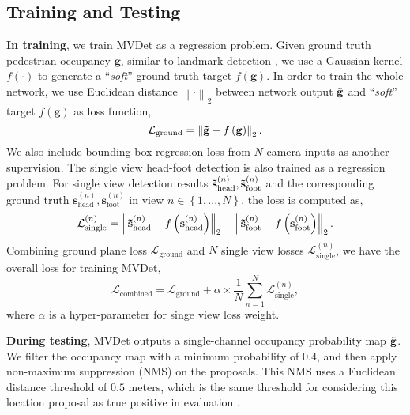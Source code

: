 \documentclass[runningheads]{llncs}
\begin{document}
\subsection{Training and Testing}
\label{sec:sec:training}
\textbf{In training}, we train MVDet as a regression problem. Given ground truth pedestrian occupancy $\mathbf{g}$, similar to landmark detection \cite{cao2017realtime}, we use a Gaussian kernel $f\left(\cdot\right)$ to generate a ``\textit{soft}'' ground truth target $f\left(\mathbf{g}\right)$. In order to train the whole network, we use Euclidean distance $\left\|\cdot\right\|_2$ between network output $\mathbf{\Tilde{g}}$ and ``\textit{soft}'' target $f\left(\mathbf{g}\right)$ as loss function,
\begin{equation}
    \label{eq:ground_loss}
    \mathcal{L}_{\text{ground}}=\left\|\mathbf{\Tilde{g}}-f\left(\mathbf{g}\right)\right\|_2. 
\end{equation}
We also include bounding box regression loss from $N$ camera inputs as another supervision. The single view head-foot detection is also trained as a regression problem. For single view detection results $\mathbf{\Tilde{s}}_{\text{head}}^{\left(n\right)},\mathbf{\Tilde{s}}_{\text{foot}}^{\left(n\right)}$ and the corresponding ground truth $\mathbf{s}_{\text{head}}^{\left(n\right)},\mathbf{s}_{\text{foot}}^{\left(n\right)}$ in view $n\in\left\{1,...,N\right\}$, the loss is computed as,
\begin{equation}
    \label{eq:single_view_loss}
    \mathcal{L}_{\text{single}}^{\left(n\right)}
    =
    \left\|\mathbf{\Tilde{s}}_{\text{head}}^{\left(n\right)}-f\left(\mathbf{s}_{\text{head}}^{\left(n\right)}\right)\right\|_2
    +
    \left\|\mathbf{\Tilde{s}}_{\text{foot}}^{\left(n\right)}-f\left(\mathbf{s}_{\text{foot}}^{\left(n\right)}\right)\right\|_2. 
\end{equation}
Combining ground plane loss $\mathcal{L}_{\text{ground}}$ and $N$ single view losses $\mathcal{L}_{\text{single}}^{\left(n\right)}$, we have the overall loss for training MVDet,
\begin{equation}
    \label{eq:combined_loss}
    \mathcal{L}_{\text{combined}}=\mathcal{L}_{\text{ground}}+\alpha \times \frac{1}{N}\sum_{n=1}^{N}{\mathcal{L}_{\text{single}}^{\left(n\right)}}, 
\end{equation}
where $\alpha$ is a hyper-parameter for singe view loss weight.

\textbf{During testing}, MVDet outputs a single-channel occupancy probability map $\mathbf{\Tilde{g}}$. We filter the occupancy map with a minimum probability of $0.4$, and then apply non-maximum suppression (NMS) on the proposals. This NMS uses a Euclidean distance threshold of $0.5$ meters, which is the same threshold for considering this location proposal as true positive in evaluation \cite{chavdarova2018wildtrack}. 
\end{document}
